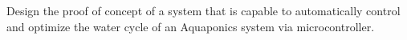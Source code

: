 Design the proof of concept of a system that is capable to automatically control and optimize the water cycle of an Aquaponics system via microcontroller.
